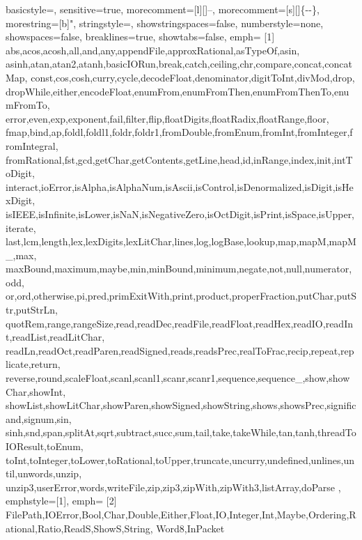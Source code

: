  {
        basicstyle=\ttfamily\footnotesize,
        sensitive=true,
        morecomment=[l][\color{hsk-comment}\ttfamily\footnotesize]{--},
        morecomment=[s][\color{hsk-comment}\ttfamily\footnotesize]{\{-}{-\}},
        morestring=[b]",
        stringstyle=\color{hsk-strings},
        showstringspaces=false,
        numberstyle=none,
        showspaces=false,
        breaklines=true,
        showtabs=false,
        emph=
        {[1]
                abs,acos,acosh,all,and,any,appendFile,approxRational,asTypeOf,asin,
                asinh,atan,atan2,atanh,basicIORun,break,catch,ceiling,chr,compare,concat,concatMap,
                const,cos,cosh,curry,cycle,decodeFloat,denominator,digitToInt,divMod,drop,
                dropWhile,either,encodeFloat,enumFrom,enumFromThen,enumFromThenTo,enumFromTo,
                error,even,exp,exponent,fail,filter,flip,floatDigits,floatRadix,floatRange,floor,
                fmap,bind,ap,foldl,foldl1,foldr,foldr1,fromDouble,fromEnum,fromInt,fromInteger,fromIntegral,
                fromRational,fst,gcd,getChar,getContents,getLine,head,id,inRange,index,init,intToDigit,
                interact,ioError,isAlpha,isAlphaNum,isAscii,isControl,isDenormalized,isDigit,isHexDigit,
                isIEEE,isInfinite,isLower,isNaN,isNegativeZero,isOctDigit,isPrint,isSpace,isUpper,iterate,
                last,lcm,length,lex,lexDigits,lexLitChar,lines,log,logBase,lookup,map,mapM,mapM_,max,
                maxBound,maximum,maybe,min,minBound,minimum,negate,not,null,numerator,odd,
                or,ord,otherwise,pi,pred,primExitWith,print,product,properFraction,putChar,putStr,putStrLn,
                quotRem,range,rangeSize,read,readDec,readFile,readFloat,readHex,readIO,readInt,readList,readLitChar,
                readLn,readOct,readParen,readSigned,reads,readsPrec,realToFrac,recip,repeat,replicate,return,
                reverse,round,scaleFloat,scanl,scanl1,scanr,scanr1,sequence,sequence_,show,showChar,showInt,
                showList,showLitChar,showParen,showSigned,showString,shows,showsPrec,significand,signum,sin,
                sinh,snd,span,splitAt,sqrt,subtract,succ,sum,tail,take,takeWhile,tan,tanh,threadToIOResult,toEnum,
                toInt,toInteger,toLower,toRational,toUpper,truncate,uncurry,undefined,unlines,until,unwords,unzip,
                unzip3,userError,words,writeFile,zip,zip3,zipWith,zipWith3,listArray,doParse
        },
        emphstyle={[1]\color{hsk-built-ins}},
        emph=
        {[2]
                FilePath,IOError,Bool,Char,Double,Either,Float,IO,Integer,Int,Maybe,Ordering,Rational,Ratio,ReadS,ShowS,String, Word8,InPacket
}}
